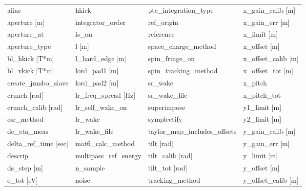  \begin{tabular}{llll} \toprule
alias                          & hkick                          & ptc_integration_type           & x_gain_calib [m]               \\
aperture [m]                   & integrator_order               & ref_origin                     & x_gain_err [m]                 \\
aperture_at                    & is_on                          & reference                      & x_limit [m]                    \\
aperture_type                  & l [m]                          & space_charge_method            & x_offset [m]                   \\
bl_hkick [T*m]                 & l_hard_edge [m]                & spin_fringe_on                 & x_offset_calib [m]             \\
bl_vkick [T*m]                 & lord_pad1 [m]                  & spin_tracking_method           & x_offset_tot [m]               \\
create_jumbo_slave             & lord_pad2 [m]                  & sr_wake                        & x_pitch                        \\
crunch [rad]                   & lr_freq_spread [Hz]            & sr_wake_file                   & x_pitch_tot                    \\
crunch_calib [rad]             & lr_self_wake_on                & superimpose                    & y1_limit [m]                   \\
csr_method                     & lr_wake                        & symplectify                    & y2_limit [m]                   \\
de_eta_meas                    & lr_wake_file                   & taylor_map_includes_offsets    & y_gain_calib [m]               \\
delta_ref_time [sec]           & mat6_calc_method               & tilt [rad]                     & y_gain_err [m]                 \\
descrip                        & multipass_ref_energy           & tilt_calib [rad]               & y_limit [m]                    \\
ds_step [m]                    & n_sample                       & tilt_tot [rad]                 & y_offset [m]                   \\
e_tot [eV]                     & noise                          & tracking_method                & y_offset_calib [m]             \\

\end{tabular}
